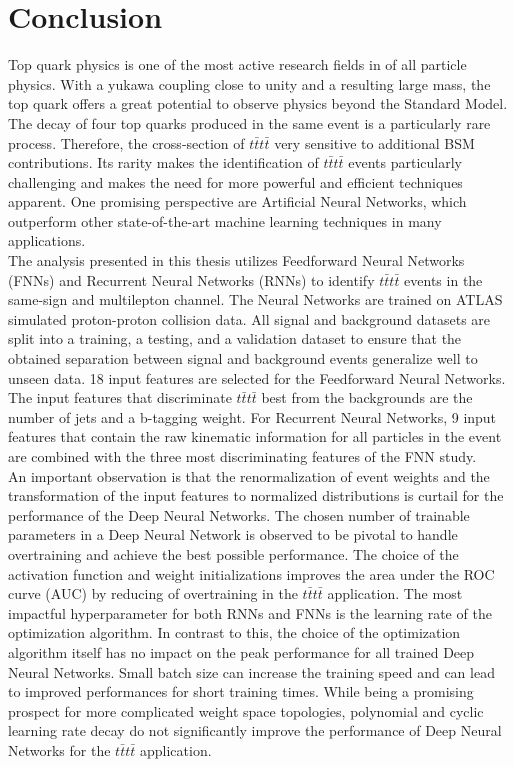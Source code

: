 \chapter{Conclusion}
\label{sec:Conclusion}

Top quark physics is one of the most active research fields in of all particle physics. With a yukawa coupling close to unity and a resulting large mass, the top quark offers a great potential to observe physics beyond the Standard Model. The decay of four top quarks produced in the same event is a particularly rare process. Therefore, the cross-section of $t\bar{t}t\bar{t}$ very sensitive to additional BSM contributions. Its rarity makes the identification of $t\bar{t}t\bar{t}$ events particularly challenging and makes the need for more powerful and efficient techniques apparent. One promising perspective are Artificial Neural Networks, which outperform other state-of-the-art machine learning techniques in many applications. \\
The analysis presented in this thesis utilizes Feedforward Neural Networks (FNNs) and Recurrent Neural Networks (RNNs) to identify $t\bar{t}t\bar{t}$ events in the same-sign and multilepton channel. The Neural Networks are trained on ATLAS simulated proton-proton collision data. All signal and background datasets are split into a training, a testing, and a validation dataset to ensure that the obtained separation between signal and background events generalize well to unseen data. 18 input features are selected for the Feedforward Neural Networks. The input features that discriminate $t\bar{t}t\bar{t}$ best from the backgrounds are the number of jets and a b-tagging weight. For Recurrent Neural Networks, 9 input features that contain the raw kinematic information for all particles in the event are combined with the three most discriminating features of the FNN study. \\
An important observation is that the renormalization of event weights and the transformation of the input features to normalized distributions is curtail for the performance of the Deep Neural Networks. The chosen number of trainable parameters in a Deep Neural Network is observed to be pivotal to handle overtraining and achieve the best possible performance. The choice of the activation function and weight initializations improves the area under the ROC curve (AUC) by reducing of overtraining in the $t\bar{t}t\bar{t}$ application. The most impactful hyperparameter for both RNNs and FNNs is the learning rate of the optimization algorithm. In contrast to this, the choice of the optimization algorithm itself has no impact on the peak performance for all trained Deep Neural Networks. Small batch size can increase the training speed and can lead to improved performances for short training times. While being a promising prospect for more complicated weight space topologies, polynomial and cyclic learning rate decay do not significantly improve the performance of Deep Neural Networks for the $t\bar{t}t\bar{t}$ application. \\
